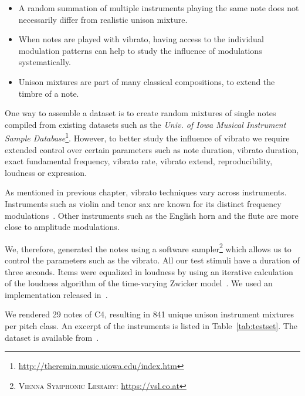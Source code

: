 \begin{itemize}
  \item A random summation of multiple instruments playing the same note does not necessarily differ from realistic unison mixture.
  \item When notes are played with vibrato, having access to the individual modulation patterns can help to study the influence of modulations systematically.
  \item Unison mixtures are part of many classical compositions, to extend the timbre of a note.
\end{itemize}

\par
One way to assemble a dataset is to create random mixtures of single notes compiled from existing datasets such as the \emph{Univ. of Iowa Musical Instrument Sample Database}\footnote{\url{http://theremin.music.uiowa.edu/index.htm}}.
However, to better study the influence of vibrato we require extended control over certain parameters such as note duration, vibrato duration, exact fundamental frequency, vibrato rate, vibrato extend, reproducibility, loudness or expression.
\par
As mentioned in previous chapter, vibrato techniques vary across instruments. 
Instruments such as violin and tenor sax are known for its distinct frequency modulations~\cite{gilbert05}.
Other instruments such as the English horn and the flute are more close to amplitude modulations.
\par
We, therefore, generated the notes using a software sampler\footnote{\textsc{Vienna Symphonic Library}: \url{https://vsl.co.at}} which allows us to control the parameters such as the vibrato.
All our test stimuli have a duration of three seconds.
Items were equalized in loudness by using an iterative calculation of the loudness algorithm of the time-varying Zwicker model~\cite{zwicker13}. 
We used an implementation released in~\cite{genesis12}. 
\par
We rendered 29 notes of C4, resulting in 841 unique unison instrument mixtures per pitch class.
An excerpt of the instruments is listed in Table~\ref{tab:testset}.
The dataset is available from~\cite{oss_unison}.

